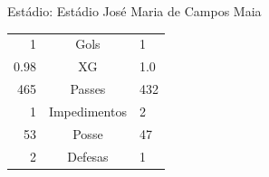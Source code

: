 \documentclass[11pt]{article}
\begin{document}
\vspace{0.5cm}
\begin{minipage}{0.65\textwidth}
\begin{center}
\begin{tabular}{rl}
\end{tabular}
\end{center}
\end{minipage}
\begin{minipage}{0.3\textwidth}
Estádio: Estádio José Maria de Campos Maia\\
\begin{tabular}{rcl}
1 & Gols & 1 \\
0.98 & XG & 1.0 \\
465 & Passes & 432 \\
1 & Impedimentos & 2 \\
53 & Posse & 47 \\
2 & Defesas & 1 \\
\end{tabular}
\end{minipage}
\newpage
\end{document}
